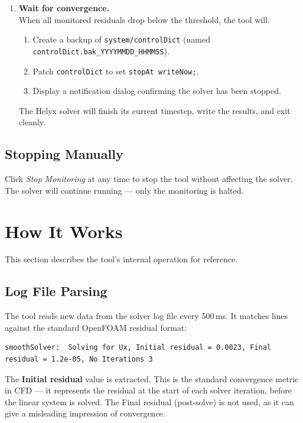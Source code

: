 \documentclass[12pt]{article}
\begin{document}
\begin{enumerate}
    \item \textbf{Wait for convergence.} \\
    When all monitored residuals drop below the threshold, the tool will:
    \begin{enumerate}[nosep]
        \item Create a backup of \texttt{system/controlDict} (named \texttt{controlDict.bak\_YYYYMMDD\_HHMMSS}).
        \item Patch \texttt{controlDict} to set \texttt{stopAt writeNow;}.
        \item Display a notification dialog confirming the solver has been stopped.
    \end{enumerate}
    The Helyx solver will finish its current timestep, write the results, and exit cleanly.
\end{enumerate}

\subsection{Stopping Manually}

Click \emph{Stop Monitoring} at any time to stop the tool without affecting the solver. The solver will continue running --- only the monitoring is halted.

\section{How It Works}

This section describes the tool's internal operation for reference.

\subsection{Log File Parsing}

The tool reads new data from the solver log file every 500\,ms. It matches lines against the standard OpenFOAM residual format:

\begin{lstlisting}
smoothSolver:  Solving for Ux, Initial residual = 0.0023, Final residual = 1.2e-05, No Iterations 3
\end{lstlisting}

The \textbf{Initial residual} value is extracted. This is the standard convergence metric in CFD --- it represents the residual at the start of each solver iteration, before the linear system is solved. The Final residual (post-solve) is not used, as it can give a misleading impression of convergence.
\end{document}
